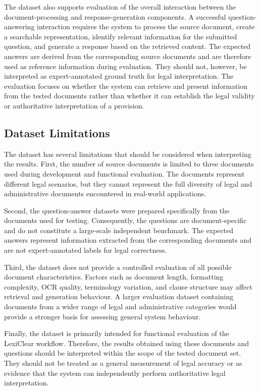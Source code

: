 \documentclass[12pt,a4paper,oneside]{report}
\begin{document}
The dataset also supports evaluation of the overall interaction between the
document-processing and response-generation components. A successful
question-answering interaction requires the system to process the source
document, create a searchable representation, identify relevant information
for the submitted question, and generate a response based on the retrieved
content. The expected answers are derived from the corresponding source documents and
are therefore used as reference information during evaluation. They should
not, however, be interpreted as expert-annotated ground truth for legal
interpretation. The evaluation focuses on whether the system can retrieve and
present information from the tested documents rather than whether it can
establish the legal validity or authoritative interpretation of a provision.

\subsection{Dataset Limitations}

The dataset has several limitations that should be considered when
interpreting the results. First, the number of source documents is limited to
three documents used during development and functional evaluation. The
documents represent different legal scenarios, but they cannot represent the
full diversity of legal and administrative documents encountered in
real-world applications.

Second, the question-answer datasets were prepared specifically from the
documents used for testing. Consequently, the questions are document-specific
and do not constitute a large-scale independent benchmark. The expected
answers represent information extracted from the corresponding documents and
are not expert-annotated labels for legal correctness.

Third, the dataset does not provide a controlled evaluation of all possible
document characteristics. Factors such as document length, formatting
complexity, OCR quality, terminology variation, and clause structure may
affect retrieval and generation behaviour. A larger evaluation dataset
containing documents from a wider range of legal and administrative categories
would provide a stronger basis for assessing general system behaviour.

Finally, the dataset is primarily intended for functional evaluation of the
LexiClear workflow. Therefore, the results obtained using these documents and
questions should be interpreted within the scope of the tested document set.
They should not be treated as a general measurement of legal accuracy or as
evidence that the system can independently perform authoritative legal
interpretation.
\end{document}
